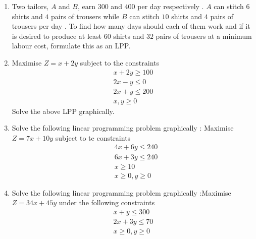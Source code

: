 \begin{enumerate}
\item Two tailors, $A$ and $B$, earn \rupee$300$ and \rupee$400$  per day respectively . $A$ can stitch $6$ shirts and $4$ pairs of trousers while $B$ can stitch $10$ shirts and $4$ pairs of trousers per day . To find how many days should each of them work and if it is desired to produce at least $60$ shirts and $32$ pairs of trousers at a minimum labour cost, formulate this as an LPP.
\item Maximise $Z=x+2y$ subject to the constraints 	\begin{align*}x + 2y \geq 100 \\2x -	y \leq 0 \\	2x + y \leq 200  \\	x , y \geq 0\end{align*} Solve the above LPP graphically. 
\item Solve the following linear programming problem graphically :\newline
Maximise $Z=7x+10y$\newline
subject to te constraints
\begin{align*}& 4x+6y \leq 240 \\& 6x+3y \leq 240 \\& x \geq 10 \\& x \geq 0, y \geq 0\end{align*}
\item Solve the following linear programming problem graphically :\newline Maximise $Z=34x+45y$ \newline under the following constraints
\begin{align*}x+y \leq 300 \\2 x+3 y \leq 70 \\x \geq 0, y \geq 0\end{align*}
\end{enumerate}
